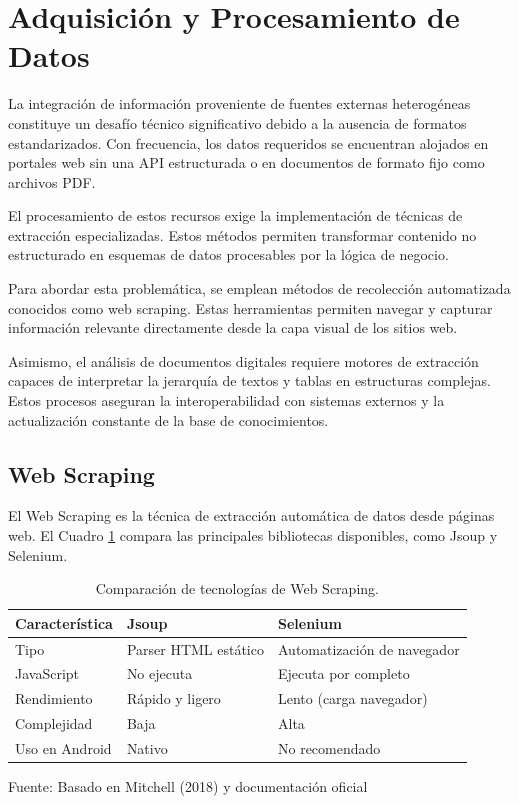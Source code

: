 \section{Adquisición y Procesamiento de Datos}
\label{sec:adquisicion-datos}

La integración de información proveniente de fuentes externas heterogéneas constituye un desafío técnico significativo debido a la ausencia de formatos estandarizados. Con frecuencia, los datos requeridos se encuentran alojados en portales web sin una API estructurada o en documentos de formato fijo como archivos PDF.

El procesamiento de estos recursos exige la implementación de técnicas de extracción especializadas. Estos métodos permiten transformar contenido no estructurado en esquemas de datos procesables por la lógica de negocio.

Para abordar esta problemática, se emplean métodos de recolección automatizada conocidos como web scraping. Estas herramientas permiten navegar y capturar información relevante directamente desde la capa visual de los sitios web.

Asimismo, el análisis de documentos digitales requiere motores de extracción capaces de interpretar la jerarquía de textos y tablas en estructuras complejas. Estos procesos aseguran la interoperabilidad con sistemas externos y la actualización constante de la base de conocimientos.

\subsection{Web Scraping}
El Web Scraping es la técnica de extracción automática de datos desde páginas web. El Cuadro \ref{tab:scraping_comparison} compara las principales bibliotecas disponibles, como Jsoup y Selenium.

\begin{table}[H]
\centering
\begin{tabularx}{\linewidth}{p{3.5cm} p{4.5cm} p{4.5cm}}
\toprule
Característica & Jsoup & Selenium \\
\midrule
Tipo & Parser HTML estático & Automatización de navegador \\
JavaScript & No ejecuta & Ejecuta por completo \\
Rendimiento & Rápido y ligero & Lento (carga navegador) \\
Complejidad & Baja & Alta \\
Uso en Android & Nativo & No recomendado \\
\bottomrule
\end{tabularx}
\caption{Comparación de tecnologías de Web Scraping.}\label{tab:scraping_comparison}
Fuente: Basado en Mitchell (2018) \cite{mitchell2018scraping} y documentación oficial \cite{jsoup_docs}
\end{table}

